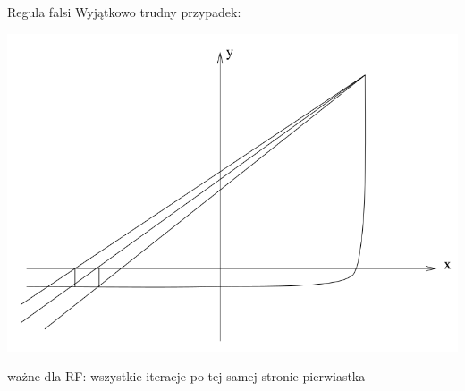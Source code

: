 \begin{frame}{Regula falsi}
	Wyjątkowo trudny przypadek:\linebreak
	\begin{center}
		\includegraphics[width=.65\linewidth]{img/7/7_6_2}
	\end{center}
	ważne dla RF: wszystkie iteracje po tej samej stronie pierwiastka
\end{frame}

